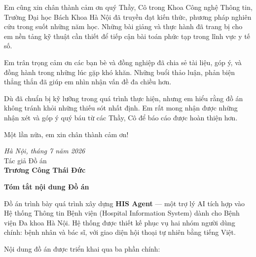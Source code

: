 \documentclass[a4paper,13pt,3p,oneside]{report}
\theoremstyle{definition}
\theoremstyle{remark}
\theoremstyle{definition}
\begin{document}
Em cũng xin chân thành cảm ơn quý Thầy, Cô trong Khoa Công nghệ Thông tin, Trường Đại học Bách Khoa Hà Nội đã truyền đạt kiến thức, phương pháp nghiên cứu trong suốt những năm học. Những bài giảng và thực hành đã trang bị cho em nền tảng kỹ thuật cần thiết để tiếp cận bài toán phức tạp trong lĩnh vực y tế số.

Em trân trọng cảm ơn các bạn bè và đồng nghiệp đã chia sẻ tài liệu, góp ý, và đồng hành trong những lúc gặp khó khăn. Những buổi thảo luận, phản biện thẳng thắn đã giúp em nhìn nhận vấn đề đa chiều hơn.

Dù đã chuẩn bị kỹ lưỡng trong quá trình thực hiện, nhưng em hiểu rằng đồ án không tránh khỏi những thiếu sót nhất định. Em rất mong nhận được những nhận xét và góp ý quý báu từ các Thầy, Cô để báo cáo được hoàn thiện hơn.

Một lần nữa, em xin chân thành cảm ơn!

\vspace{1cm}
\hspace{0.5\textwidth}
\begin{minipage}{0.5\textwidth}
    \begin{center}
        \textit{Hà Nội, tháng 7 năm 2026} \\
        Tác giả Đồ án \\
        \vspace{2cm}
        \textbf{Trương Công Thái Đức}
    \end{center}
\end{minipage}

\newpage
{}
\fontsize{22pt}{16pt}\selectfont
{\bfseries Tóm tắt nội dung Đồ án}
\fontsize{13pt}{16pt}\selectfont
\bigskip
\bigskip

Đồ án trình bày quá trình xây dựng \textbf{HIS Agent} --- một trợ lý AI tích hợp vào Hệ thống Thông tin Bệnh viện (Hospital Information System) dành cho Bệnh viện Đa khoa Hà Nội. Hệ thống được thiết kế phục vụ hai nhóm người dùng chính: bệnh nhân và bác sĩ, với giao diện hội thoại tự nhiên bằng tiếng Việt.

Nội dung đồ án được triển khai qua ba phần chính:
\end{document}
